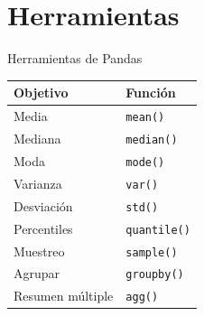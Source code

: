 \documentclass[aspectratio=169,11pt]{beamer}
\begin{document}
\section{Herramientas}

\begin{frame}{Herramientas de Pandas}

\small

\begin{table}
\centering

\begin{tabular}{ll}
\toprule

\textbf{Objetivo} &
\textbf{Función} \\

\midrule

Media &
\texttt{mean()} \\

Mediana &
\texttt{median()} \\

Moda &
\texttt{mode()} \\

Varianza &
\texttt{var()} \\

Desviación &
\texttt{std()} \\

Percentiles &
\texttt{quantile()} \\

Muestreo &
\texttt{sample()} \\

Agrupar &
\texttt{groupby()} \\

Resumen múltiple &
\texttt{agg()} \\

\bottomrule

\end{tabular}

\end{table}

\end{frame}

\end{document}
